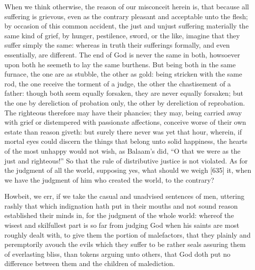 When we think otherwise, the reason of our misconceit herein is, that because all suffering is grievous, even as the contrary pleasant and acceptable unto the flesh; by occasion of this common accident, the just and unjust suffering materially the same kind of grief, by hunger, pestilence, sword, or the like, imagine that they suffer simply the same: whereas in truth their sufferings formally, and even essentially, are different. The end of God is never the same in both, howsoever upon both he seemeth to lay the same burthens. But being both in the same furnace, the one are as stubble, the other as gold: being stricken with the same rod, the one receive the torment of a judge, the other the chastisement of a father: though both seem equally forsaken, they are never equally forsaken; but the one by dereliction of probation only, the other by dereliction of reprobation. The righteous therefore may have their phancies; they may, being carried away with grief or distempered with passionate affections, conceive worse of their own estate than reason giveth: but surely there never was yet that hour, wherein, if mortal eyes could discern the things that belong unto solid happiness, the hearts of the most unhappy would not wish, as Balaam’s did, “O that we were as the just and righteous!” So that the rule of distributive justice is not violated. As for the judgment of all the world, supposing yes, what should we weigh [635] it, when we have the judgment of him who created the world, to the contrary?

Howbeit, we err, if we take the casual and unadvised sentences of men, uttering rashly that which indignation hath put in their mouths and not sound reason established their minds in, for the judgment of the whole world: whereof the wisest and skilfullest part is so far from judging God when his saints are most roughly dealt with, to give them the portion of malefactors, that they plainly and peremptorily avouch the evils which they suffer to be rather seals assuring them of everlasting bliss, than tokens arguing unto others, that God doth put no difference between them and the children of malediction.

